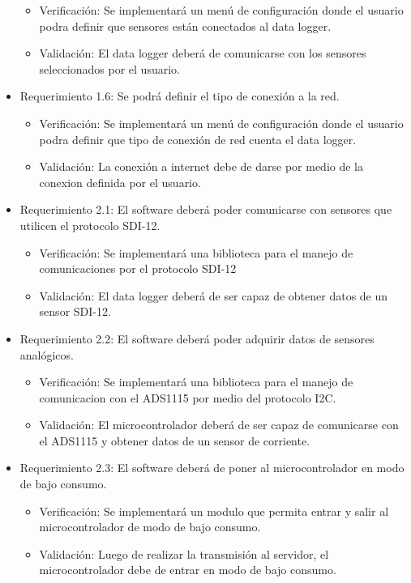 \documentclass[
11pt, %
]{charter}
\begin{document}
\begin{itemize}
\begin{itemize}
		\item Verificación: Se implementará un menú de configuración donde el usuario podra definir que sensores están conectados al data logger.
		\item Validación: El data logger deberá de comunicarse con los sensores seleccionados por el usuario.
	\end{itemize}
\item Requerimiento 1.6: Se podrá definir el tipo de conexión a la red.
	\begin{itemize}
		\item Verificación: Se implementará un menú de configuración donde el usuario podra definir que tipo de conexión de red cuenta el data logger.
		\item Validación: La conexión a internet debe de darse por medio de la conexion definida por el usuario. 
	\end{itemize}
\item Requerimiento 2.1: El software deberá poder comunicarse con sensores que utilicen el protocolo SDI-12.
	\begin{itemize}
		\item Verificación: Se implementará una biblioteca para el manejo de comunicaciones por el protocolo SDI-12
		\item Validación: El data logger deberá de ser capaz de obtener datos de un sensor SDI-12.
	\end{itemize}
\item Requerimiento 2.2: El software deberá poder adquirir datos de sensores analógicos.
	\begin{itemize}
		\item Verificación: Se implementará una biblioteca para el manejo de comunicacion con el ADS1115 por medio del protocolo I2C.
		\item Validación: El microcontrolador deberá de ser capaz de comunicarse con el ADS1115 y obtener datos de un sensor de corriente.
	\end{itemize}	
\item Requerimiento 2.3: El software deberá de poner al microcontrolador en modo de bajo consumo.
	\begin{itemize}
		\item Verificación: Se implementará un modulo que permita entrar y salir al microcontrolador de modo de bajo consumo. 
		\item Validación: Luego de realizar la transmisión al servidor, el microcontrolador debe de entrar en modo de bajo consumo.
	\end{itemize}

\end{itemize}
\end{document}
